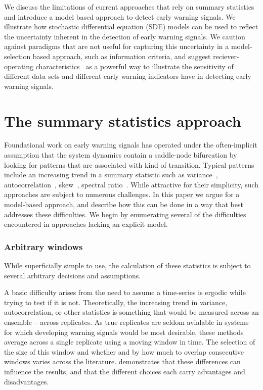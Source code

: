\documentclass[authoryear,review,11pt]{elsarticle}
\begin{document}

We discuss the limitations of current approaches that rely on summary statistics
and introduce a model based approach to detect early warning signals.
We illustrate how stochastic differential equation (SDE) models can be used 
to reflect the uncertainty inherent in the detection of early warning signals.
We caution against paradigms that are not useful for capturing this uncertainty in 
a model-selection based approach, such as information criteria,
and suggest reciever-operating characteristics~\citep{Green1989, Keller2009}
as a powerful way to illustrate the sensitivity of different data sets 
and different early warning indicators have in detecting early warning signals.  


\section{The summary statistics approach}
Foundational work on early warning signals has operated under the often-implicit assumption 
that the system dynamics contain a saddle-node bifurcation by
looking for patterns that are associated with kind of transition.
Typical patterns include an increasing trend in a summary statistic such as
variance~\citep{Carpenter2006}, autocorrelation~\citep{Held2004, Dakos2008},
skew~\citep{Guttal2008}, spectral ratio~\citep{Biggs2009}.
While attractive for their simplicity, such approaches are subject to numerous challenges.
In this paper we argue for a model-based approach, 
and describe how this can be done in a way that best addresses these difficulties.
We begin by enumerating several of the difficulties encountered in approaches lacking an explicit model. 


\subsubsection*{Arbitrary windows}
While superficially simple to use,
the calculation of these statistics is subject to several arbitrary decisions and assumptions.

A basic difficulty arises from the need to assume a time-series is ergodic 
while trying to test if it is not.  
Theoretically, the increasing trend in variance, autocorrelation, or other statistics
is something that would be measured across an ensemble -- across replicates. %
As true replicates are seldom avialable in systems for which developing warning signals would be most desirable,
these methods average across a single replicate using a moving window in time.  
The selection of the size of this window and whether and by how much to overlap consecutive windows
varies across the literature.  
\citet{Lenton2012} demonstrates that these differences can influence the results, 
and that the different choices each carry advantages and disadvantages.
\end{document}

